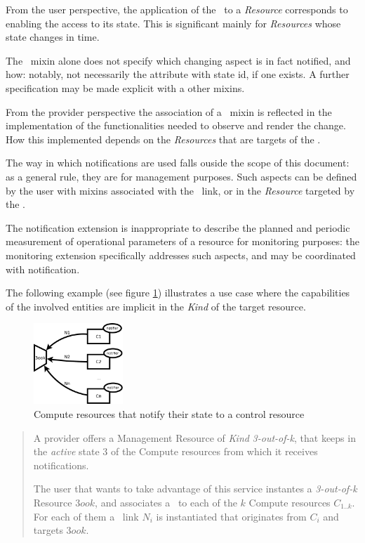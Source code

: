\documentclass[10pt,a4paper]{article}
\begin{document}
From the user perspective, the application of the \smx\ to a {\em Resource} corresponds to enabling the access to its state. This is significant mainly for {\em Resources} whose state changes in time.

The \smx\ mixin alone does not specify which changing aspect is in fact notified, and how: notably, not necessarily the attribute with {\sc state} id, if one exists. A further specification may be made explicit with a other mixins.

From the provider perspective the association of a \smx\ mixin is reflected in the implementation of the functionalities needed to observe and render the change. How this implemented depends on the {\em Resources} that are targets of the \ntfl.

The way in which notifications are used falls ouside the scope of this document: as a general rule, they are for management purposes. Such aspects can be defined by the user with mixins associated with the \ntfl\ link, or in the {\em Resource} targeted by the \ntfl.

The notification extension is inappropriate to describe the planned and periodic measurement of operational parameters of a resource for monitoring purposes: the monitoring extension \cite{occi:monitoring} specifically addresses such aspects, and may be coordinated with notification.

The following example (see figure \ref{fig:example}) illustrates a use case where the capabilities of the involved entities are implicit in the {\em Kind} of the target resource.

\begin{figure}
\centering
\includegraphics[width=0.3\textwidth]{figs/notificationExample.pdf}
\caption{Compute resources that notify their state to a control resource \label{fig:example}}
\end{figure}

\begin{quote}
A provider offers a Management Resource of {\em Kind} {\em 3-out-of-k}, that keeps in the {\em active} state 3 of the Compute resources from which it receives notifications.

The user that wants to take advantage of this service instantes a {\em 3-out-of-k} Resource $3ook$, and associates a \smx\ to each of the $k$ Compute resources $C_{1..k}$. For each of them a \ntfl\ link $N_i$ is instantiated that originates from $C_i$ and targets $3ook$.
\end{quote}
\end{document}

